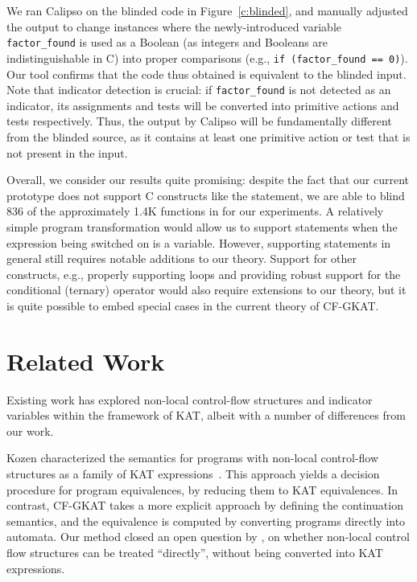 We ran Calipso on the blinded code in Figure~\ref{c:blinded}, and manually adjusted the output to change instances where the newly-introduced variable \lstinline{factor_found} is used as a Boolean (as integers and Booleans are indistinguishable in C) into proper comparisons (e.g., \lstinline{if (factor_found == 0)}). Our tool confirms that the code thus obtained is equivalent to the blinded input. Note that indicator detection is crucial: if \lstinline{factor_found} is not detected as an indicator, its assignments and tests will be converted into primitive actions and tests respectively. Thus, the output by Calipso will be fundamentally different from the blinded source, as it contains at least one primitive action or test that is not present in the input.

Overall, we consider our results quite promising: despite the fact that our current prototype does not support C constructs like the  statement, we are able to blind 836 of the approximately 1.4K functions in  for our experiments. A relatively simple program transformation would allow us to support  statements when the expression being switched on is a variable. 
However, supporting  statements in general still requires notable additions to our theory.
Support for other constructs, e.g., properly supporting  loops and providing robust support for the conditional (ternary) operator would also require extensions to our theory, but it is quite possible to embed special cases in the current theory of CF-GKAT.


\section{Related Work}%
\label{sec:related-work}



Existing work has explored non-local control-flow structures and indicator variables within the framework of KAT, albeit with a number of differences from our work.  

Kozen characterized the semantics for programs with non-local control-flow structures as a family of KAT expressions~\cite{kozen_NonlocalFlowControl_2008}.
This approach yields a decision procedure for program equivalences, by reducing them to KAT equivalences.
In contrast, CF-GKAT takes a more explicit approach by defining the continuation semantics, and the equivalence is computed by converting programs directly into automata.
Our method closed an open question by \citet{kozen_NonlocalFlowControl_2008}, on whether non-local control flow structures can be treated ``directly'', without being converted into KAT expressions.

